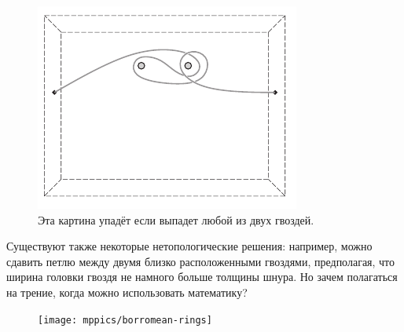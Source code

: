 \begin{figure}[h!]
\centering
\includegraphics[scale=1]{pics/kartina2}
\caption{Эта картина упадёт если выпадет любой из двух гвоздей.}
\label{pic:kartina2}
\end{figure}

Существуют также некоторые нетопологические решения: например, можно сдавить петлю между двумя близко расположенными гвоздями, предполагая, что ширина головки гвоздя не намного больше толщины шнура.
Но зачем полагаться на трение, когда можно использовать математику?

\begin{figure}
\vskip-18mm
\centering
\texttt{[image: mppics/borromean-rings]}
\vskip-3mm
\caption{}
\label{pic:borromean-rings}
\end{figure}

